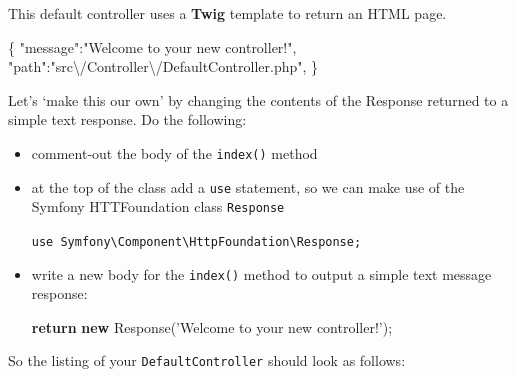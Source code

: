 \documentclass[a4paperpaper,openright]{book}
\newenvironment{Shaded}{}{}
\newcommand{\CharTok}[1]{\textcolor[rgb]{0.25,0.44,0.63}{#1}}
\newcommand{\DataTypeTok}[1]{\textcolor[rgb]{0.56,0.13,0.00}{#1}}
\newcommand{\FunctionTok}[1]{\textcolor[rgb]{0.02,0.16,0.49}{#1}}
\newcommand{\KeywordTok}[1]{\textcolor[rgb]{0.00,0.44,0.13}{\textbf{#1}}}
\newcommand{\NormalTok}[1]{#1}
\newcommand{\OtherTok}[1]{\textcolor[rgb]{0.00,0.44,0.13}{#1}}
\newcommand{\StringTok}[1]{\textcolor[rgb]{0.25,0.44,0.63}{#1}}
\begin{document}
This default controller uses a \textbf{Twig} template to return an HTML
page.

\begin{Shaded}
\begin{Highlighting}[]
    \FunctionTok{\{}
        \DataTypeTok{"message"}\FunctionTok{:}\StringTok{"Welcome to your new controller!"}\FunctionTok{,}
        \DataTypeTok{"path"}\FunctionTok{:}\StringTok{"src}\CharTok{\textbackslash{}/}\StringTok{Controller}\CharTok{\textbackslash{}/}\StringTok{DefaultController.php"}\FunctionTok{,}
    \FunctionTok{\}}
\end{Highlighting}
\end{Shaded}

Let's `make this our own' by changing the contents of the Response
returned to a simple text response. Do the following:

\begin{itemize}
\item
  comment-out the body of the \texttt{index()} method
\item
  at the top of the class add a \texttt{use} statement, so we can make
  use of the Symfony HTTFoundation class \texttt{Response}

  \texttt{use\ Symfony\textbackslash{}Component\textbackslash{}HttpFoundation\textbackslash{}Response;}
\item
  write a new body for the \texttt{index()} method to output a simple
  text message response:

\begin{Shaded}
\begin{Highlighting}[]
    \KeywordTok{return} \KeywordTok{new}\NormalTok{ Response}\OtherTok{(}\StringTok{'Welcome to your new controller!'}\OtherTok{);}
\end{Highlighting}
\end{Shaded}
\end{itemize}

So the listing of your \texttt{DefaultController} should look as
follows:
\end{document}
